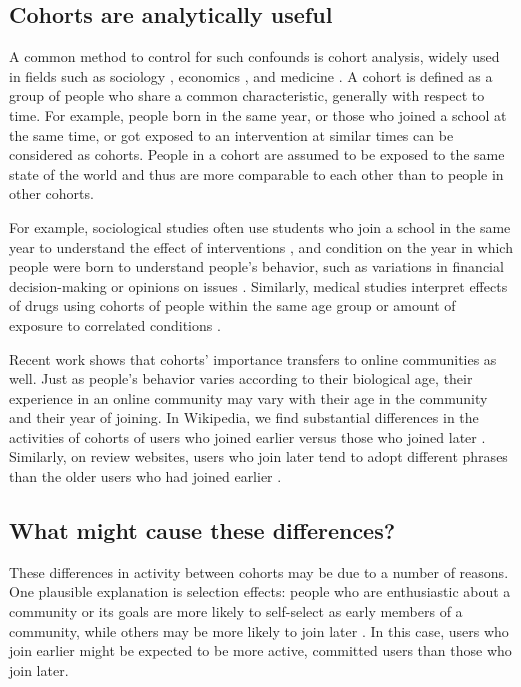 \subsection{Cohorts are analytically useful}

A common method to control for such confounds is cohort analysis, widely used in fields such as sociology \cite{Mason2012,Glenn2005}, economics \cite{Attanasio1993,Beldona2005}, and medicine \cite{Howartz1996,Davis2010}. A cohort is defined as a group of people who share a common characteristic, generally with respect to time. For example, people born in the same year, or those who joined a school at the same time, or got exposed to an intervention at similar times can be considered as cohorts.  People in a cohort are assumed to be exposed to the same state of the world and thus are more comparable to each other than to people in other cohorts. 

For example, sociological studies often use students who join a school in the same year to understand the effect of interventions \cite{Goyette2008,Alexander2012}, and condition on the year in which people were born to understand people's  behavior, such as variations in financial decision-making \cite{Attanasio1993} or opinions on issues \cite{Firebaugh1988,Jennings1996}. Similarly, medical studies interpret effects of drugs using cohorts of people within the same age group or amount of exposure to correlated conditions \cite{Howartz1996,Davis2010}.  

Recent work shows that cohorts' importance transfers to online communities as well. Just as people's behavior varies according to their biological age, their experience in an online community may vary with their age in the community and their year of joining. In Wikipedia, we find substantial differences in the activities of cohorts of users who joined earlier versus those who joined later \cite{Welser2011}. Similarly, on review websites, users who join later tend to adopt different phrases than the older users who had joined earlier \cite{Danescu-niculescu-mizil2013}.

\subsection{What might cause these differences?}

These differences in activity between cohorts may be due to a number of reasons.  One plausible explanation is selection effects: people who are enthusiastic about a community or its goals are more likely to self-select as early members of a community, while others may be more likely to join later \cite{Li2008}.  In this case, users who join earlier might be expected to be more active, committed users than those who join later. 

